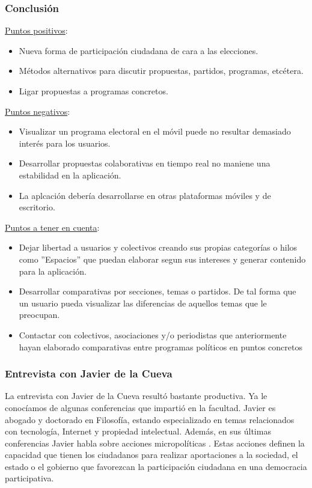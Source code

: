 \subsubsection{Conclusión}

\underline{Puntos positivos}:

\begin{itemize}
 \item Nueva forma de participación ciudadana de cara a las elecciones.
 \item Métodos alternativos para discutir propuestas, partidos, programas, etcétera.
 \item Ligar propuestas a programas concretos.
\end{itemize}

\underline{Puntos negativos}:

\begin{itemize}
 \item Visualizar un programa electoral en el móvil puede no resultar demasiado interés para los usuarios.
 \item Desarrollar propuestas colaborativas en tiempo real no maniene una estabilidad en la aplicación.
 \item La aplcación debería desarrollarse en otras plataformas móviles y de escritorio.
\end{itemize}

\underline{Puntos a tener en cuenta}:

\begin{itemize}
 \item Dejar libertad a usuarios y colectivos creando sus propias categorías o hilos como ''Espacios'' que puedan elaborar segun sus intereses y generar contenido para la aplicación.
 \item Desarrollar comparativas por secciones, temas o partidos. De tal forma que un usuario pueda visualizar las diferencias de aquellos temas que le preocupan.
 \item Contactar con colectivos, asociaciones y/o periodistas que anteriormente hayan elaborado comparativas entre programas políticos en puntos concretos
\end{itemize}

\subsubsection{Entrevista con Javier de la Cueva}

La entrevista con Javier de la Cueva resultó bastante productiva. Ya le conocíamos de algunas conferencias que impartió en la facultad. Javier es abogado y doctorado en Filosofía, estando especializado en temas relacionados con tecnología, Internet y propiedad intelectual. Además, en sus últimas conferencias Javier habla sobre acciones micropolíticas \cite{ref:manualCiberactivista}. Estas acciones definen la capacidad que tienen los ciudadanos para realizar aportaciones a la sociedad, el estado o el gobierno que favorezcan la participación ciudadana en una democracia participativa.

